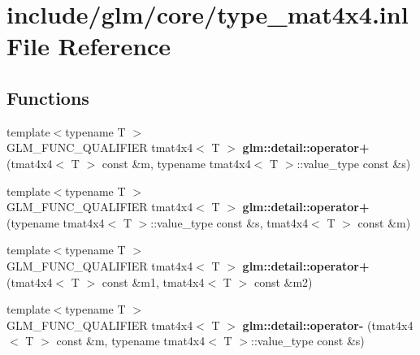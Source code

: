 \hypertarget{type__mat4x4_8inl}{\section{include/glm/core/type\-\_\-mat4x4.inl \-File \-Reference}
\label{type__mat4x4_8inl}
}
\subsection*{\-Functions}
\begin{DoxyCompactItemize}
\item 
\hypertarget{namespaceglm_1_1detail_a083841e8898763bb3eb998a12e7e17e7}{{\footnotesize template$<$typename T $>$ }\\\-G\-L\-M\-\_\-\-F\-U\-N\-C\-\_\-\-Q\-U\-A\-L\-I\-F\-I\-E\-R tmat4x4$<$ \-T $>$ {\bfseries glm\-::detail\-::operator+} (tmat4x4$<$ \-T $>$ const \&m, typename tmat4x4$<$ \-T $>$\-::value\-\_\-type const \&s)}\label{namespaceglm_1_1detail_a083841e8898763bb3eb998a12e7e17e7}

\item 
\hypertarget{namespaceglm_1_1detail_ab9eca823432fd7598fc78ad3b9420cf4}{{\footnotesize template$<$typename T $>$ }\\\-G\-L\-M\-\_\-\-F\-U\-N\-C\-\_\-\-Q\-U\-A\-L\-I\-F\-I\-E\-R tmat4x4$<$ \-T $>$ {\bfseries glm\-::detail\-::operator+} (typename tmat4x4$<$ \-T $>$\-::value\-\_\-type const \&s, tmat4x4$<$ \-T $>$ const \&m)}\label{namespaceglm_1_1detail_ab9eca823432fd7598fc78ad3b9420cf4}

\item 
\hypertarget{namespaceglm_1_1detail_ac9370bb87b47a02306b13b558092d0f5}{{\footnotesize template$<$typename T $>$ }\\\-G\-L\-M\-\_\-\-F\-U\-N\-C\-\_\-\-Q\-U\-A\-L\-I\-F\-I\-E\-R tmat4x4$<$ \-T $>$ {\bfseries glm\-::detail\-::operator+} (tmat4x4$<$ \-T $>$ const \&m1, tmat4x4$<$ \-T $>$ const \&m2)}\label{namespaceglm_1_1detail_ac9370bb87b47a02306b13b558092d0f5}

\item 
\hypertarget{namespaceglm_1_1detail_ac4a53ae4ed2d7973eab134462242e5ee}{{\footnotesize template$<$typename T $>$ }\\\-G\-L\-M\-\_\-\-F\-U\-N\-C\-\_\-\-Q\-U\-A\-L\-I\-F\-I\-E\-R tmat4x4$<$ \-T $>$ {\bfseries glm\-::detail\-::operator-\/} (tmat4x4$<$ \-T $>$ const \&m, typename tmat4x4$<$ \-T $>$\-::value\-\_\-type const \&s)}\label{namespaceglm_1_1detail_ac4a53ae4ed2d7973eab134462242e5ee}


\end{DoxyCompactItemize}
